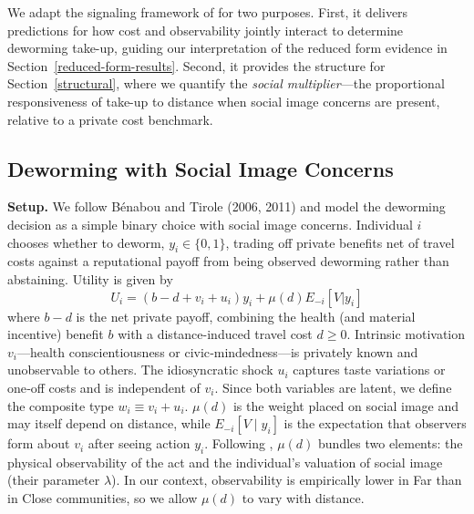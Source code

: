 \documentclass[12pt,a4paper]{article}
\begin{document}
We adapt the signaling framework of \citet{Benabou_laws_2011} for two purposes. First, it delivers predictions for how cost and observability jointly interact to determine deworming take-up, guiding our interpretation of the reduced form evidence in Section~\ref{reduced-form-results}. Second, it provides the structure for Section~\ref{structural}, where we quantify the \emph{social multiplier}—the proportional responsiveness of take-up to distance when social image concerns are present, relative to a private cost benchmark.


\subsection{Deworming with Social Image Concerns}

\textbf{Setup.} We follow Bénabou and Tirole (2006, 2011) and model the deworming decision as a simple binary choice with social image concerns.
Individual $i$ chooses whether to deworm, $y_i \in \{0,1\}$, trading off private benefits net of travel costs against a reputational payoff from being observed deworming rather than abstaining. Utility is given by 
\begin{equation}
U_i = (b - d + v_i + u_i)y_i  +  \mu(d) E_{-i}[V | y_i] \nonumber
\end{equation} 
where $b - d$ is the net private payoff, combining the health (and material incentive) benefit \(b\) with a distance-induced travel cost $d\ge0$. Intrinsic motivation $v_i$—health conscientiousness or civic‑mindedness—is privately known and unobservable to others. The idiosyncratic shock \(u_i\) captures taste variations or one‑off costs and is independent of \(v_i\).  Since both variables are latent, we define the composite type \(w_i \equiv v_i + u_i\). \(\mu(d)\) is the weight placed on social image and may itself depend on distance, while \(E_{-i}[V \mid y_i]\) is the expectation that observers form about $v_i$ after seeing action $y_i$. Following \citet{Benabou_laws_2011}, \(\mu(d)\) bundles two elements: the physical observability of the act and the individual’s valuation of social image (their parameter $\lambda$). In our context, observability is empirically lower in Far than in Close communities, so we allow $\mu(d)$ to vary with distance.

\end{document}
